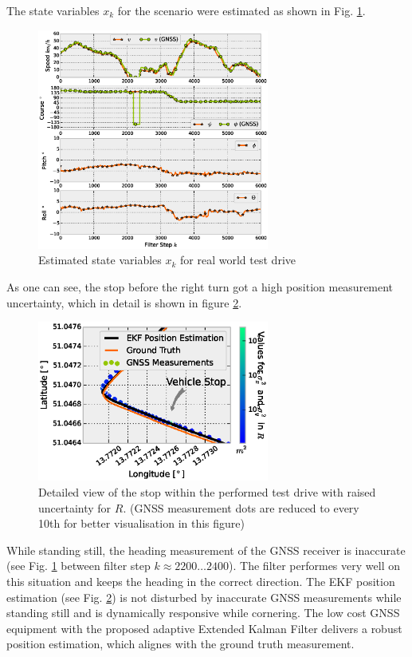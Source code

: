 \documentclass[a4paper,twoside]{article}
\begin{document}
The state variables $x_k$ for the scenario were estimated as shown in Fig. \ref{ctrv-states}.

\begin{figure}[ht]
\centering
\includegraphics[width=3.0in]{images/Extended-Kalman-Filter-CTRV-Attitude-State-Estimates}
\caption{Estimated state variables $x_k$ for real world test drive}
\label{ctrv-states}
\end{figure}

As one can see, the stop before the right turn got a high position measurement uncertainty, which in detail is shown in figure \ref{ctrv-position-detail}.

\begin{figure}[ht]
\centering
\includegraphics[width=3.0in]{images/Extended-Kalman-Filter-CTRV-Position-Detail}
\caption{Detailed view of the stop within the performed test drive with raised uncertainty for $R$. (GNSS measurement dots are reduced to every 10th for better visualisation in this figure)}
\label{ctrv-position-detail}
\end{figure}

While standing still, the heading measurement of the GNSS receiver is inaccurate (see Fig. \ref{ctrv-states} between filter step $k\approx2200\dotsc2400$). The filter performes very well on this situation and keeps the heading in the correct direction. The EKF position estimation (see Fig. \ref{ctrv-position-detail}) is not disturbed by inaccurate GNSS measurements while standing still and is dynamically responsive while cornering. The low cost GNSS equipment with the proposed adaptive Extended Kalman Filter delivers a robust position estimation, which alignes with the ground truth measurement. 
\end{document}
